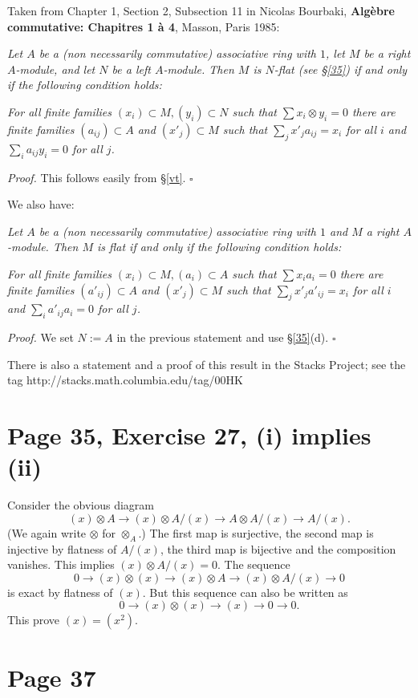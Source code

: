 \documentclass[parskip=half]{scrartcl}%
\begin{document}
Taken from Chapter 1, Section 2, Subsection 11 in Nicolas Bourbaki, \textbf{Algèbre commutative: Chapitres 1 à 4}, Masson, Paris 1985:

\emph{Let $A$ be a (non necessarily commutative) associative ring with $1$, let $M$ be a right $A$-module, and let $N$ be a left $A$-module. Then $M$ is $N$-flat (see \S\ref{35}) if and only if the following condition holds:}

\emph{For all finite families $(x_i)\subset M,(y_i)\subset N$ such that $\sum x_i\otimes y_i=0$ there are finite families $(a_{ij})\subset A$ and $(x'_j)\subset M$ such that $\sum_jx'_ja_{ij}=x_i$ for all $i$ and $\sum_ia_{ij}y_i=0$ for all $j$.}

\emph{Proof.} This follows easily from \S\ref{vt}. $\square$

We also have:

\emph{Let $A$ be a (non necessarily commutative) associative ring with $1$ and $M$ a right $A$-module. Then $M$ is flat if and only if the following condition holds:}

\emph{For all finite families $(x_i)\subset M,(a_i)\subset A$ such that $\sum x_ia_i=0$ there are finite families $(a'_{ij})\subset A$ and $(x'_j)\subset M$ such that $\sum_jx'_ja'_{ij}=x_i$ for all $i$ and $\sum_ia'_{ij}a_i=0$ for all $j$.}

\emph{Proof.} We set $N:=A$ in the previous statement and use \S\ref{35}(d). $\square$

There is also a statement and a proof of this result in the Stacks Project; see the tag http://stacks.math.columbia.edu/tag/00HK

\section{Page 35, Exercise 27, (i) implies (ii)}%

Consider the obvious diagram
$$
(x)\otimes A\to(x)\otimes A/(x)\to A\otimes A/(x)\to A/(x). 
$$ 
(We again write $\otimes$ for $\otimes_A$.) The first map is surjective, the second map is injective by flatness of $A/(x)$, the third map is bijective and the composition vanishes. This implies $(x)\otimes A/(x)=0$. The sequence 
$$
0\to(x)\otimes(x)\to(x)\otimes A\to(x)\otimes A/(x)\to0
$$ 
is exact by flatness of $(x)$. But this sequence can also be written as 
$$
0\to(x)\otimes(x)\to(x)\to0\to0.
$$ 
This prove $(x)=(x^2)$.

\section{Page 37}%
\end{document}
